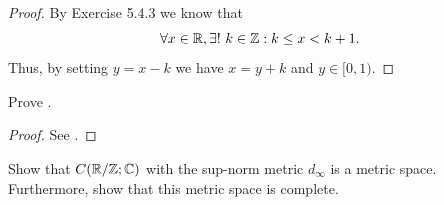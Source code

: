 \begin{proof}
  By Exercise 5.4.3 we know that
  \[
    \forall x \in \mathbb{R}, \exists!\ k \in \mathbb{Z} : k \leq x < k + 1.
  \]
  Thus, by setting \(y = x - k\) we have \(x = y + k\) and \(y \in [0, 1)\).
\end{proof}

\begin{ex}\label{ii:ex:5.1.2}
  Prove .
\end{ex}

\begin{proof}
  See .
\end{proof}

\begin{ex}\label{ii:ex:5.1.3}
  Show that \(C(\mathbb{R} / \mathbb{Z} ; \mathbb{C})\) with the sup-norm metric \(d_\infty\) is a metric space.
  Furthermore, show that this metric space is complete.
\end{ex}

